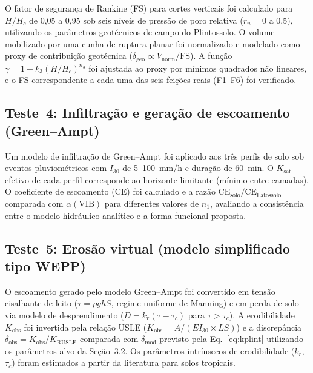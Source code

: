 \documentclass[pdflatex,sn-basic]{sn-jnl}
\begin{document}
O fator de segurança de Rankine (FS) \citep{rankine_1857} para cortes verticais foi calculado para $H/H_c$ de 0,05 a 0,95 sob seis níveis de pressão de poro relativa ($r_u = 0$ a 0,5), utilizando os parâmetros geotécnicos de campo do Plintossolo. O volume mobilizado por uma cunha de ruptura planar foi normalizado e modelado como proxy de contribuição geotécnica ($\delta_{\mathrm{geo}} \propto V_{\mathrm{norm}}/\mathrm{FS}$). A função $\gamma = 1 + k_3(H/H_c)^{n_3}$ foi ajustada ao proxy por mínimos quadrados não lineares, e o FS correspondente a cada uma das seis feições reais (F1--F6) foi verificado.

\subsection{Teste~4: Infiltração e geração de escoamento (Green--Ampt)}

Um modelo de infiltração de Green--Ampt \citep{green_ampt_1911} foi aplicado aos três perfis de solo sob eventos pluviométricos com $I_{30}$ de 5--100~mm/h e duração de 60~min. O $K_{\mathrm{sat}}$ efetivo de cada perfil corresponde ao horizonte limitante (mínimo entre camadas). O coeficiente de escoamento (CE) foi calculado e a razão $\mathrm{CE}_{\mathrm{solo}}/\mathrm{CE}_{\mathrm{Latossolo}}$ comparada com $\alpha(\mathrm{VIB})$ para diferentes valores de $n_1$, avaliando a consistência entre o modelo hidráulico analítico e a forma funcional proposta.

\subsection{Teste~5: Erosão virtual (modelo simplificado tipo WEPP)}

O escoamento gerado pelo modelo Green--Ampt foi convertido em tensão cisalhante de leito ($\tau = \rho g h S$, regime uniforme de Manning) e em perda de solo via modelo de desprendimento ($D = k_r(\tau - \tau_c)$ para $\tau > \tau_c$). A erodibilidade $K_{\mathrm{obs}}$ foi invertida pela relação USLE ($K_{\mathrm{obs}} = A/(EI_{30} \times LS)$) e a discrepância $\delta_{\mathrm{obs}} = K_{\mathrm{obs}}/K_{\mathrm{RUSLE}}$ comparada com $\delta_{\mathrm{mod}}$ previsto pela Eq.~\ref{eq:kplint} utilizando os parâmetros-alvo da Seção~3.2. Os parâmetros intrínsecos de erodibilidade ($k_r$, $\tau_c$) foram estimados a partir da literatura para solos tropicais.

\end{document}
